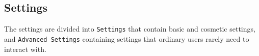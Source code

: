 \subsection{Settings}
The settings are divided into \texttt{Settings} that contain basic and cosmetic settings, and \texttt{Advanced Settings} containing settings that ordinary users rarely need to interact with.

